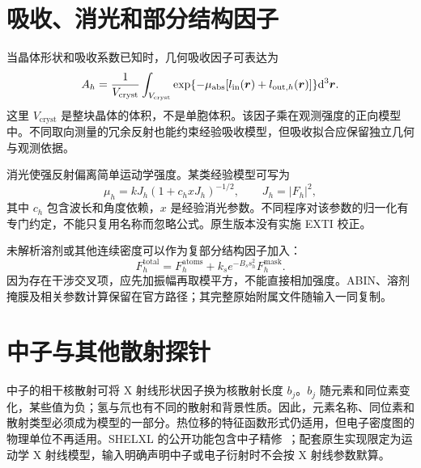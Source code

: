 \section{吸收、消光和部分结构因子}
当晶体形状和吸收系数已知时，几何吸收因子可表达为
\begin{equation}
A_h=\frac{1}{V_{\mathrm{cryst}}}\int_{V_{\mathrm{cryst}}}\exp\{-\mu_{\mathrm{abs}}[l_{\mathrm{in}}(\bm{r})+l_{\mathrm{out},h}(\bm{r})]\}\mathrm{d}^3\bm{r}.
\end{equation}
这里 $V_{\mathrm{cryst}}$ 是整块晶体的体积，不是单胞体积。该因子乘在观测强度的正向模型中。不同取向测量的冗余反射也能约束经验吸收模型，但吸收拟合应保留独立几何与观测依据。

消光使强反射偏离简单运动学强度。某类经验模型可写为
\begin{equation}
\mu_h=kJ_h(1+c_hxJ_h)^{-1/2},\qquad J_h=|F_h|^2,
\end{equation}
其中 $c_h$ 包含波长和角度依赖，$x$ 是经验消光参数。不同程序对该参数的归一化有专门约定，不能只复用名称而忽略公式。原生版本没有实施 EXTI 校正。

未解析溶剂或其他连续密度可以作为复部分结构因子加入：
\begin{equation}
F_h^{\mathrm{total}}=F_h^{\mathrm{atoms}}+k_s e^{-B_s s_h^2}F_h^{\mathrm{mask}}.
\end{equation}
因为存在干涉交叉项，应先加振幅再取模平方，不能直接相加强度。ABIN、溶剂掩膜及相关参数计算保留在官方路径；其完整原始附属文件随输入一同复制。

\section{中子与其他散射探针}
中子的相干核散射可将 X 射线形状因子换为核散射长度 $b_j$。$b_j$ 随元素和同位素变化，某些值为负；氢与氘也有不同的散射和背景性质。因此，元素名称、同位素和散射类型必须成为模型的一部分。热位移的特征函数形式仍适用，但电子密度图的物理单位不再适用。SHELXL 的公开功能包含中子精修~\cite{shelxl2015}；配套原生实现限定为运动学 X 射线模型，输入明确声明中子或电子衍射时不会按 X 射线参数默算。
